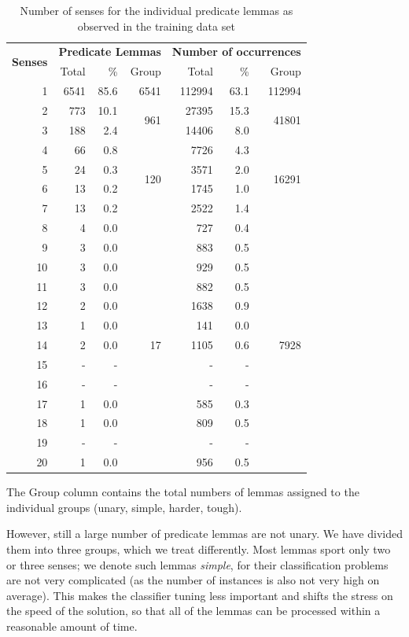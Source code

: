 \documentclass[12pt,notitlepage]{report}
\begin{document}
\begin{table}[htb]
\caption{Number of senses for the individual predicate lemmas as observed in the training data set}\label{tab:senses-num}\footnotesize
\begin{center}
\begin{tabular}{|r|rrr|rrr|}\hline
\multirow{2}{*}{\bf Senses} & \multicolumn{3}{c|}{\bf Predicate Lemmas} & \multicolumn{3}{c|}{\bf Number of occurrences} \\
 & Total & \% & Group & Total & \% & Group \\\hline
1 & 6541 & 85.6 & 6541 & 112994 & 63.1 & 112994 \\\hline
2 & 773 & 10.1  & \multirow{2}{*}{961} & 27395 & 15.3 & \multirow{2}{*}{41801} \\
3 & 188 & 2.4 & & 14406 & 8.0 & \\\hline
4 & 66 & 0.8 & \multirow{4}{*}{120} & 7726 & 4.3 & \multirow{4}{*}{16291} \\
5 & 24 & 0.3 & & 3571 & 2.0 & \\
6 & 13 & 0.2 & & 1745 & 1.0 & \\
7 & 13 & 0.2 & & 2522 & 1.4 & \\
8 & 4 & 0.0 & & 727 & 0.4 & \\\hline
9 & 3 & 0.0 & \multirow{11}{*}{17} & 883 & 0.5 & \multirow{11}{*}{7928} \\
10 & 3 & 0.0 & & 929 & 0.5 & \\
11 & 3 & 0.0 & & 882 & 0.5 & \\
12 & 2 & 0.0 & & 1638 & 0.9 & \\
13 & 1 & 0.0 & & 141 & 0.0 & \\
14 & 2 & 0.0 & & 1105 & 0.6 & \\
15 & - & - & & - & - & \\
16 & - & - & & - & - & \\
17 & 1 & 0.0 & & 585 & 0.3 & \\
18 & 1 & 0.0 & & 809 & 0.5 & \\
19 & - & - & & - & - & \\
20 & 1 & 0.0 & & 956 & 0.5 & \\\hline
\end{tabular}
\end{center}
The Group column contains the total numbers of lemmas assigned to the individual groups (unary, simple, harder, tough).
\end{table}

However, still a large number of predicate lemmas are not unary. We have divided them into three groups, which we treat differently. Most lemmas sport only two or three senses; we denote such lemmas \emph{simple}, for their classification problems are not very complicated (as the number of instances is also not very high on average). This makes the classifier tuning less important and shifts the stress on the speed of the solution, so that all of the lemmas can be processed within a reasonable amount of time.
\end{document}
